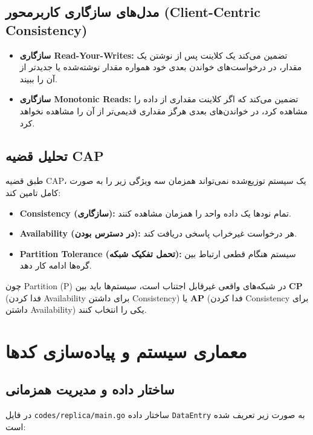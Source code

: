 \documentclass[12pt,a4paper]{article}
\begin{document}
\subsection{مدل‌های سازگاری کاربرمحور (Client-Centric Consistency)}
\begin{itemize}
    \item \textbf{سازگاری Read-Your-Writes:} تضمین می‌کند یک کلاینت پس از نوشتن یک مقدار، در درخواست‌های خواندن بعدی خود همواره مقدار نوشته‌شده یا جدیدتر از آن را ببیند.
    \item \textbf{سازگاری Monotonic Reads:} تضمین می‌کند که اگر کلاینت مقداری از داده را مشاهده کرد، در خواندن‌های بعدی هرگز مقداری قدیمی‌تر از آن را مشاهده نخواهد کرد.
\end{itemize}

\subsection{تحلیل قضیه CAP}
طبق قضیه CAP، یک سیستم توزیع‌شده نمی‌تواند همزمان سه ویژگی زیر را به صورت کامل تامین کند:
\begin{itemize}
    \item \textbf{Consistency (سازگاری):} تمام نودها یک داده واحد را همزمان مشاهده کنند.
    \item \textbf{Availability (در دسترس بودن):} هر درخواست غیرخراب پاسخی دریافت کند.
    \item \textbf{Partition Tolerance (تحمل تفکیک شبکه):} سیستم هنگام قطعی ارتباط بین گره‌ها ادامه کار دهد.
\end{itemize}
چون Partition (P) در شبکه‌های واقعی غیرقابل اجتناب است، سیستم‌ها باید بین \textbf{CP} (فدا کردن Availability برای داشتن Consistency) یا \textbf{AP} (فدا کردن Consistency برای داشتن Availability) یکی را انتخاب کنند.

\section{معماری سیستم و پیاده‌سازی کدها}

\subsection{ساختار داده و مدیریت همزمانی}
در فایل \texttt{codes/replica/main.go} ساختار داده \texttt{DataEntry} به صورت زیر تعریف شده است:
\end{document}
